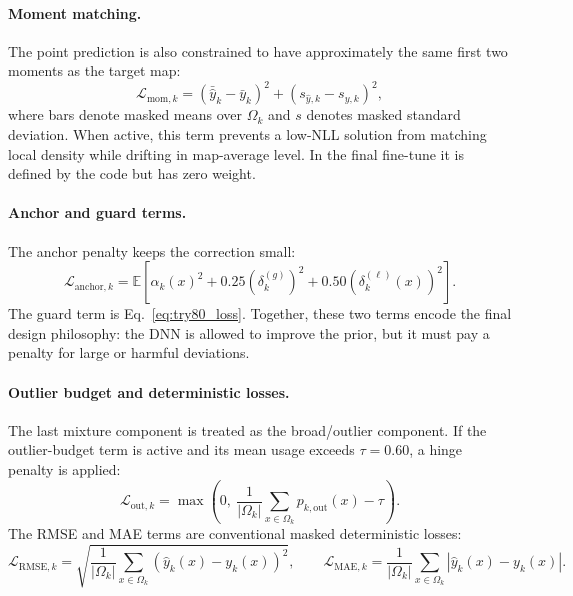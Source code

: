 \paragraph{Moment matching.}
The point prediction is also constrained to have approximately the same first
two moments as the target map:
\begin{equation}
\mathcal{L}_{\mathrm{mom},k}
=
\left(\bar{\hat y}_k-\bar y_k\right)^2
+
\left(s_{\hat y,k}-s_{y,k}\right)^2,
\label{eq:try80_moment}
\end{equation}
where bars denote masked means over \(\Omega_k\) and \(s\) denotes masked
standard deviation. When active, this term prevents a low-NLL solution from
matching local density while drifting in map-average level. In the final
fine-tune it is defined by the code but has zero weight.

\paragraph{Anchor and guard terms.}
The anchor penalty keeps the correction small:
\begin{equation}
\mathcal{L}_{\mathrm{anchor},k}
=
\mathbb{E}
\left[
\alpha_k(x)^2
+
0.25\left(\delta^{(g)}_k\right)^2
+
0.50\left(\delta^{(\ell)}_k(x)\right)^2
\right].
\label{eq:try80_anchor}
\end{equation}
The guard term is Eq.~\eqref{eq:try80_loss}. Together, these two terms encode
the final design philosophy: the DNN is allowed to improve the
prior, but it must pay a penalty for large or harmful deviations.

\paragraph{Outlier budget and deterministic losses.}
The last mixture component is treated as the broad/outlier component. If the
outlier-budget term is active and its mean usage exceeds \(\tau=0.60\), a
hinge penalty is applied:
\begin{equation}
\mathcal{L}_{\mathrm{out},k}
=
\max\left(
0,\
\frac{1}{|\Omega_k|}
\sum_{x\in\Omega_k}
p_{k,\mathrm{out}}(x)
-
\tau
\right).
\label{eq:try80_outlier}
\end{equation}
The RMSE and MAE terms are conventional masked deterministic losses:
\begin{equation}
\mathcal{L}_{\mathrm{RMSE},k}
=
\sqrt{
\frac{1}{|\Omega_k|}
\sum_{x\in\Omega_k}
\left(\hat y_k(x)-y_k(x)\right)^2
},
\qquad
\mathcal{L}_{\mathrm{MAE},k}
=
\frac{1}{|\Omega_k|}
\sum_{x\in\Omega_k}
\left|\hat y_k(x)-y_k(x)\right|.
\label{eq:try80_rmse_mae_loss}
\end{equation}


